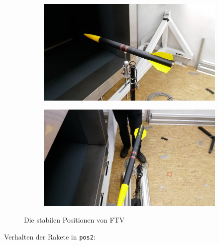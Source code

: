 \documentclass[10pt,a4paper]{article}
\begin{document}
\begin{figure}[h]
\begin{subfigure}[l]{0.49\textwidth}
	\centering
	\includegraphics[width=\textwidth]{Bilder/Windkanal-pos1.jpg}
	\label{sfig-Windkanal-pos1}
\end{subfigure}\hfill	
\begin{subfigure}[r]{0.49\textwidth}
	\centering
	\includegraphics[width=\textwidth]{Bilder/Windkanal-pos2.jpg}
	\label{sfig-Windkanal-pos2}
\end{subfigure}
\caption{Die stabilen Positionen von FTV}
\end{figure}

\noindent
Verhalten der Rakete in \texttt{pos2}:
\end{document}
